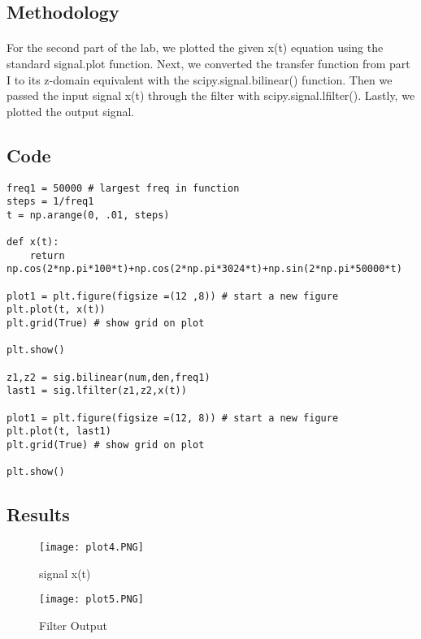 \subsection{Methodology}

\paragraph{}
For the second part of the lab, we plotted the given x(t) equation using the standard signal.plot function.  Next, we converted the transfer function from part I to its z-domain equivalent with the scipy.signal.bilinear() function.  Then we passed the input signal x(t) through the filter with scipy.signal.lfilter().  Lastly, we plotted the output signal.

\subsection{Code}
\begin{scriptsize}
\begin{lstlisting}
freq1 = 50000 # largest freq in function
steps = 1/freq1 
t = np.arange(0, .01, steps) 

def x(t): 
    return np.cos(2*np.pi*100*t)+np.cos(2*np.pi*3024*t)+np.sin(2*np.pi*50000*t)
    
plot1 = plt.figure(figsize =(12 ,8)) # start a new figure
plt.plot(t, x(t))
plt.grid(True) # show grid on plot

plt.show()

z1,z2 = sig.bilinear(num,den,freq1)
last1 = sig.lfilter(z1,z2,x(t))

plot1 = plt.figure(figsize =(12, 8)) # start a new figure
plt.plot(t, last1)
plt.grid(True) # show grid on plot

plt.show()
\end{lstlisting}
\end{scriptsize}

\subsection{Results}
\begin{figure}[H]
    \centering
    \texttt{[image: plot4.PNG]}
   	\caption{signal x(t)}
\end{figure} 

\begin{figure}[H]
    \centering
    \texttt{[image: plot5.PNG]}
   	\caption{Filter Output}
\end{figure} 

